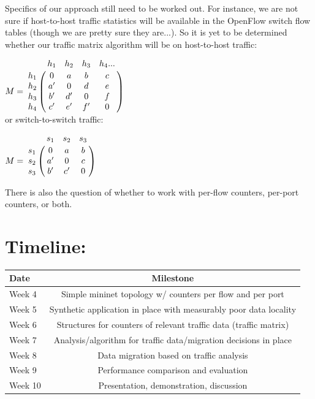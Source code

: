 \documentclass[12pt]{article}
\begin{document}
Specifics of our approach still need to be worked out.  For instance, we are not sure if host-to-host
traffic statistics will be available in the OpenFlow switch flow tables (though we are pretty sure they
are...).  So it is yet to be determined whether our traffic matrix algorithm will be on host-to-host
traffic:

$
M = \bordermatrix{~ & h_1 & h_2 & h_3 & h_4 ... \cr
                  h_1 & 0 & a & b & c\cr
                  h_2 & a' & 0 & d & e\cr
                  h_3 & b' & d' & 0 & f\cr
                  h_4 & c' & e' & f' & 0\cr}
\vspace{5mm}
$
\\
\vspace{3mm}
\noindent or switch-to-switch traffic:

$
M = \bordermatrix{~ & s_1 & s_2 & s_3 \cr
                  s_1 & 0  & a & b \cr
                  s_2 & a' & 0 & c \cr
                  s_3 & b' & c' & 0 \cr}
$
\\
\vspace{3mm}

There is also the question of whether to work with per-flow counters, per-port counters, or both.

\section*{Timeline:}
\label{timeline}
\begin{center}
  \begin{tabular}{ l || c }
    \hline
    Date & Milestone \\ \hline \hline
    Week 4  & Simple mininet topology w/ counters per flow and per port \\ \hline
    Week 5  & Synthetic application in place with measurably poor data locality \\ \hline
    Week 6  & Structures for counters of relevant traffic data (traffic matrix) \\ \hline
    Week 7  & Analysis/algorithm for traffic data/migration decisions in place \\ \hline
    Week 8  & Data migration based on traffic analysis \\ \hline
    Week 9  & Performance comparison and evaluation \\ \hline
    Week 10 & Presentation, demonstration, discussion \\ 
    \hline
  \end{tabular}
\end{center}
\end{document}
